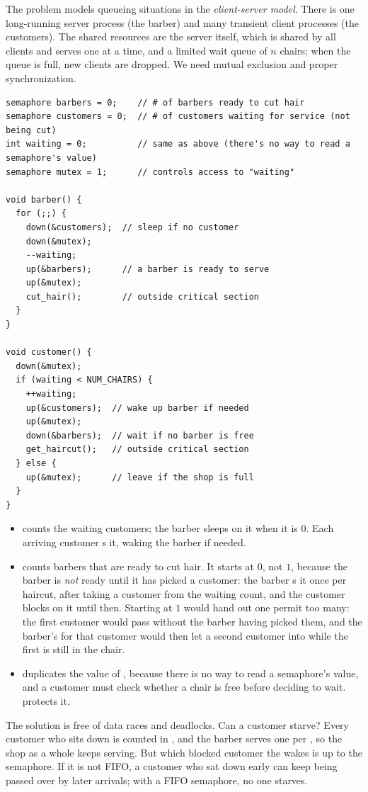 The problem models queueing situations in the \emph{client-server model}. There is one long-running server process (the barber) and many transient client processes (the customers). The shared resources are the server itself, which is shared by all clients and serves one at a time, and a limited wait queue of $n$ chairs; when the queue is full, new clients are dropped. We need mutual exclusion and proper synchronization.

\begin{lstlisting}
semaphore barbers = 0;    // # of barbers ready to cut hair
semaphore customers = 0;  // # of customers waiting for service (not being cut)
int waiting = 0;          // same as above (there's no way to read a semaphore's value)
semaphore mutex = 1;      // controls access to "waiting"

void barber() {
  for (;;) {
    down(&customers);  // sleep if no customer
    down(&mutex);
    --waiting;
    up(&barbers);      // a barber is ready to serve
    up(&mutex);
    cut_hair();        // outside critical section
  }
}

void customer() {
  down(&mutex);
  if (waiting < NUM_CHAIRS) {
    ++waiting;
    up(&customers);  // wake up barber if needed
    up(&mutex);
    down(&barbers);  // wait if no barber is free
    get_haircut();   // outside critical section
  } else {
    up(&mutex);      // leave if the shop is full
  }
}
\end{lstlisting}
\begin{itemize}
  \item {} counts the waiting customers; the barber sleeps on it when it is $0$. Each arriving customer s it, waking the barber if needed.
  \item {} counts barbers that are ready to cut hair. It starts at $0$, not $1$, because the barber is \emph{not} ready until it has picked a customer: the barber s it once per haircut, after taking a customer from the waiting count, and the customer blocks on it until then. Starting at $1$ would hand out one permit too many: the first customer would pass without the barber having picked them, and the barber's  for that customer would then let a second customer into  while the first is still in the chair.
  \item {} duplicates the value of , because there is no way to read a semaphore's value, and a customer must check whether a chair is free before deciding to wait.  protects it.
\end{itemize}
The solution is free of data races and deadlocks. Can a customer starve? Every customer who sits down is counted in , and the barber serves one per , so the shop as a whole keeps serving. But which blocked customer the  wakes is up to the semaphore. If it is not FIFO, a customer who sat down early can keep being passed over by later arrivals; with a FIFO semaphore, no one starves.

